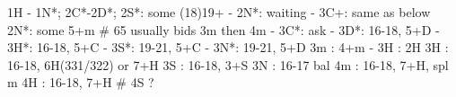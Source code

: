1H - 1N*; 2C*-2D*; 
2S*: some (18)19+
   - 2N*: waiting
		- 3C+: same as below
2N*: some 5+m  # 65 usually bids 3m then 4m
   - 3C*: ask
		- 3D*: 16-18, 5+D
		- 3H*: 16-18, 5+C
		- 3S*: 19-21, 5+C
		- 3N*: 19-21, 5+D
3m : 4+m
   - 3H : 2H
3H : 16-18, 6H(331/322) or 7+H
3S : 16-18, 3+S
3N : 16-17 bal
4m : 16-18, 7+H, spl m
4H : 16-18, 7+H
# 4S ?